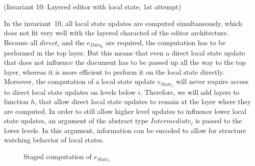 {\centering (Invariant 10: Layered editor with local state, 1st attempt)\\}\vspace{1em}




In the invariant~10, all local state updates are computed simultaneously, which does not fit very well with the layered characted of the editor architecture. Because all $direct_i$ and the $e_{Data_0}$ are required, the computation has to be performed in the top layer. But this means that even a direct local state update that does not influence the document has to be passed up all the way to the top layer, whereas it is more efficient to perform it on the local state directly. Moreover, the computation of a local state update $e_{State_i}$ will never require access to direct local state updates on levels below $i$. Therefore, we will add layers to function $h$, that allow direct local state updates to remain at the layer where they are computed. In order to still allow higher level updates  to influence lower local state updates, an argument of the abstract type $Intermediate_i$ is passed to the lower levels. In this argument, information can be encoded to allow for structure watching behavior of local states.
\begin{figure}
\begin{small}
\begin{center}
\begin{center}
\begin{small}
\bigskip \noindent
{}
\end{small}
\end{center}\caption{Staged computation of $e_{State_i}$ }\label{stagedh} 
\end{center}
\end{small}
\end{figure}


